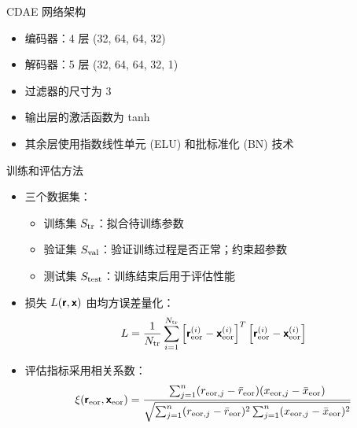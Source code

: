 \documentclass{beamer}
\begin{document}
\begin{frame}[t]
  \begin{alertblock}{CDAE 网络架构}
  \end{alertblock}
  \begin{itemize}
    \item 编码器：4 层 (32, 64, 64, 32)
    \item 解码器：5 层 (32, 64, 64, 32, 1)
    \item 过滤器的尺寸为 3
    \item 输出层的激活函数为 \alert{tanh}
    \item 其余层使用\alert{指数线性单元} (ELU) 和\alert{批标准化} (BN) 技术
  \end{itemize}
  \begin{figure}
  \end{figure}
\end{frame}

\begin{frame}[t]
  \begin{alertblock}{训练和评估方法}
  \end{alertblock}
  \begin{itemize}
    \item 三个数据集：
      \begin{itemize}
        \item \alert{训练集 $S_{\text{tr}}$}：拟合待训练参数
        \item \alert{验证集 $S_{\text{val}}$}：验证训练过程是否正常；约束超参数
        \item \alert{测试集 $S_{\text{test}}$}：训练结束后用于评估性能
      \end{itemize}
    \item 损失 $L(\bm{\mathsf{r}}, \bm{\mathsf{x}})$ 由\alert{均方误差}量化：
      \begin{equation}
        L = \frac{1}{N_{\text{tr}}} \sum_{i=1}^{N_{\text{tr}}}
            \left[ \bm{\mathsf{r}}_{\text{eor}}^{(i)} - \bm{\mathsf{x}}_{\text{eor}}^{(i)} \right]^T
            \left[ \bm{\mathsf{r}}_{\text{eor}}^{(i)} - \bm{\mathsf{x}}_{\text{eor}}^{(i)} \right]
      \end{equation}
    \item 评估指标采用\alert{相关系数}：
      \begin{equation}
        \xi(\bm{\mathsf{r}}_{\text{eor}}, \bm{\mathsf{x}}_{\text{eor}})
          = \frac{\sum_{j=1}^{n}(r_{\text{eor},j} - \bar{r}_{\text{eor}})
              (x_{\text{eor},j} - \bar{x}_{\text{eor}})}{
                \sqrt{\sum_{j=1}^{n}(r_{\text{eor},j} - \bar{r}_{\text{eor}})^2
                \sum_{j=1}^{n}(x_{\text{eor},j} - \bar{x}_{\text{eor}})^2}
            }
      \end{equation}
  \end{itemize}
\end{frame}
\end{document}
